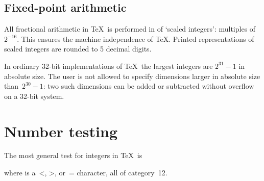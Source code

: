 \documentclass{book}
\begin{document}
\subsection{Fixed-point arithmetic}

All fractional arithmetic in \TeX\ is performed in
of `scaled integers': multiples of~$2^{-16}$.
This ensures the machine independence of \TeX.
Printed representations of scaled integers are rounded
to 5 decimal digits.

In ordinary 32-bit implementations of \TeX\ the largest
integers are $2^{31}-1$ in absolute size.
The user is not allowed to specify
dimensions larger in absolute size than~$2^{30}-1$: two
such dimensions can be added or subtracted without
overflow on a 32-bit system.

\section{Number testing}

The most general test for integers in \TeX\ is
\begin{disp}\end{disp}
where  is a~\n<, \n>, or~\n= character,
all of category~12.
\end{document}
